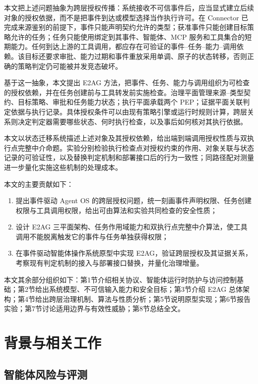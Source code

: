 本文把上述问题抽象为跨层授权传播：系统接收不可信事件后，应当显式建立后续对象的授权依据，而不是把事件到达或模型选择当作执行许可。在 Connector 已完成来源鉴别的前提下，事件只能声明契约允许的类型；获准事件只能创建目标策略允许的任务；任务只能使用绑定到其事件、智能体、MCP 服务和工具集合的短期能力。任何到达上游的工具调用，都应存在可验证的事件--任务--能力--调用依赖。该目标还要求审批、能力过期和事件重放采用单调、原子的状态转移，否则正确的策略判定仍可能被并发竞态破坏。

基于这一抽象，本文提出 E2AG 方法，把事件、任务、能力与调用组织为可检查的授权依赖，并在任务创建前与工具转发前实施检查。治理平面管理来源--类型契约、目标策略、审批和任务能力状态；执行平面承载两个 PEP；证据平面关联判定依据与执行记录。具体授权条件可以由现有策略引擎或运行时规则计算，跨层关系则决定判定器需要哪些状态、何时执行检查，以及事后如何核对其执行依据。

本文以状态迁移系统描述上述对象及其授权依赖，给出端到端调用授权性质与双执行点完整中介命题。实验分别检验执行检查点对授权约束的作用、对象关联与状态记录的可验证性，以及替换判定机制和部署接口后的行为一致性；同路径配对测量进一步量化实施这些机制的处理成本。

本文的主要贡献如下：
\begin{enumerate}
  \item 提出事件驱动 Agent OS 的跨层授权问题，统一刻画事件声明权限、任务创建权限与工具调用权限，给出可由算法和实验共同检查的安全性质；
  \item 设计 E2AG 三平面架构、任务作用域能力和双执行点完整中介算法，使工具调用不能脱离触发它的事件与任务单独获得权限；
  \item 在事件驱动智能体操作系统原型中实现 E2AG，验证跨层授权及其证据关系，考察现有判定机制的接入与部署接口替换，并量化治理增量。
\end{enumerate}

本文其余部分组织如下：第1节介绍相关协议、智能体运行时防护与访问控制基础；第2节给出系统模型、不可信输入能力和安全目标；第3节介绍 E2AG 总体架构；第4节给出跨层治理机制、算法与性质分析；第5节说明原型实现；第6节报告实验；第7节讨论适用边界与有效性威胁；第8节总结全文。

\section{背景与相关工作}\label{sec:related-v11}

\subsection{智能体风险与评测}

